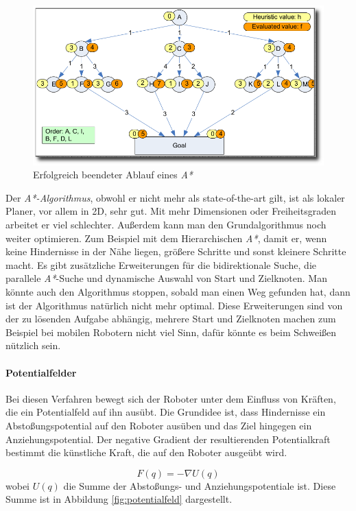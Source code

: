 \begin{figure}[h]
\center
\includegraphics[scale=0.3]{graphics/AStar.png}
\caption{\label{fig:a*} Erfolgreich beendeter Ablauf eines \textit{A*}  \citep{innoKonz}}
\end{figure}

Der \textit{A*-Algorithmus}, obwohl er nicht mehr als state-of-the-art gilt\citep{innoKonz}, ist als lokaler Planer, vor allem in 2D, sehr gut.
Mit mehr Dimensionen oder Freiheitsgraden arbeitet er viel schlechter.
Außerdem kann man den Grundalgorithmus noch weiter optimieren.
Zum Beispiel mit dem Hierarchischen \textit{A*}, damit er, wenn keine Hindernisse in der Nähe liegen, größere Schritte und sonst kleinere Schritte macht.
Es gibt zusätzliche Erweiterungen für die bidirektionale Suche, die parallele \textit{A*}-Suche und dynamische Auswahl von Start und Zielknoten.
Man könnte auch den Algorithmus stoppen, sobald man einen Weg gefunden hat, dann ist der Algorithmus natürlich nicht mehr optimal.
Diese Erweiterungen sind von der zu lösenden Aufgabe abhängig, mehrere Start und Zielknoten machen zum Beispiel bei mobilen Robotern nicht viel Sinn, dafür könnte es beim Schweißen nützlich sein.

\paragraph{Potentialfelder}

Bei diesen Verfahren bewegt sich der Roboter unter dem Einfluss von Kräften, die ein Potentialfeld auf ihn ausübt.
Die Grundidee ist, dass Hindernisse ein Abstoßungspotential auf den Roboter ausüben und das Ziel hingegen ein Anziehungspotential.
Der negative Gradient der resultierenden Potentialkraft bestimmt die künstliche Kraft, die auf den Roboter ausgeübt wird.

\begin{equation}
F(q) = - \nabla U(q)
\end{equation}
wobei $U(q)$ die Summe der Abstoßungs- und Anziehungspotentiale ist.
Diese Summe ist in Abbildung \ref{fig:potentialfeld} dargestellt.

